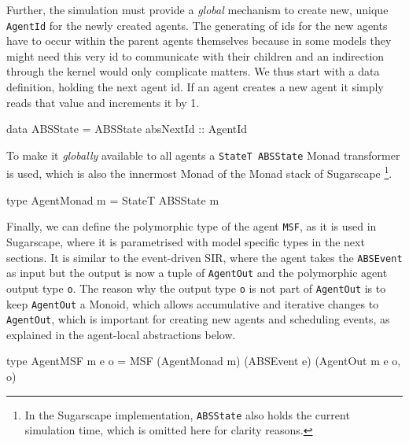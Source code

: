 Further, the simulation must provide a \textit{global} mechanism to create new, unique \texttt{AgentId} for the newly created agents. The generating of ids for the new agents have to occur within the parent agents themselves because in some models they might need this very id to communicate with their children and an indirection through the kernel would only complicate matters. We thus start with a data definition, holding the next agent id. If an agent creates a new agent it simply reads that value and increments it by 1.

\begin{HaskellCode}
data ABSState = ABSState { absNextId :: AgentId }
\end{HaskellCode}

To make it \textit{globally} available to all agents a \texttt{StateT ABSState} Monad transformer is used, which is also the innermost Monad of the Monad stack of Sugarscape \footnote{In the Sugarscape implementation, \texttt{ABSState} also holds the current simulation time, which is omitted here for clarity reasons.}.

\begin{HaskellCode}
type AgentMonad m = StateT ABSState m
\end{HaskellCode}

Finally, we can define the polymorphic type of the agent \texttt{MSF}, as it is used in Sugarscape, where it is parametrised with model specific types in the next sections. It is similar to the event-driven SIR, where the agent takes the \texttt{ABSEvent} as input but the output is now a tuple of \texttt{AgentOut} and the polymorphic agent output type \texttt{o}. The reason why the output type \texttt{o} is not part of \texttt{AgentOut} is to keep \texttt{AgentOut} a Monoid, which allows accumulative and iterative changes to \texttt{AgentOut}, which is important for creating new agents and scheduling events, as explained in the agent-local abstractions below.

\begin{HaskellCode}
type AgentMSF m e o = MSF (AgentMonad m) (ABSEvent e) (AgentOut m e o, o)
\end{HaskellCode}